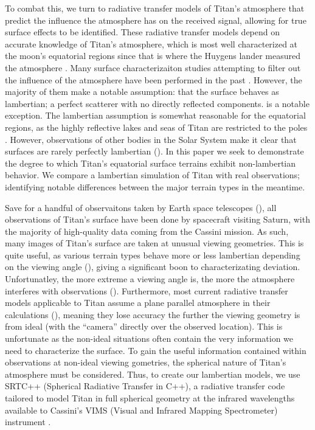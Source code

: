 \documentclass[twocolumn,linenumbers]{aastex631}
\begin{document}
To combat this, we turn to radiative transfer models of Titan's atmosphere that predict the influence the atmosphere has on the received signal, allowing for true surface effects to be identified. These radiative transfer models depend on accurate knowledge of Titan's atmosphere, which is most well characterized at the moon's equatorial regions since that is where the Huygens lander measured the atmosphere \citep{Tomasko2008}. Many surface characterizaiton studies attempting to filter out the influence of the atmosphere have been performed in the past \citep{Soderblom2009, Kazeminejad2011, Brossier2018, EsSayeh2023, Solomonidou2024}. However, the majority of them make a notable assumption: that the surface behaves as lambertian; a perfect scatterer with no directly reflected components. \cite{Buratti2006} is a notable exception. The lambertian assumption is somewhat reasonable for the equatorial regions, as the highly reflective lakes and seas of Titan are restricted to the poles \citep{Hayes2016}. However, observations of other bodies in the Solar System make it clear that surfaces are rarely perfectly lambertian (). In this paper we seek to demonstrate the degree to which Titan's equatorial surface terrains exhibit non-lambertian behavior. We compare a lambertian simulation of Titan with real observations; identifying notable differences between the major terrain types in the meantime.

Save for a handful of observaitons taken by Earth space telescopes (), all observations of Titan's surface have been done by spacecraft visiting Saturn, with the majority of high-quality data coming from the Cassini mission. As such, many images of Titan's surface are taken at unusual viewing geometries. This is quite useful, as various terrain types behave more or less lambertian depending on the viewing angle (), giving a significant boon to characterizating deviation. Unfortunatley, the more extreme a viewing angle is, the more the atmosphere interferes with observations (). Furthermore, most current radiative transfer models applicable to Titan assume a plane parallel atmosphere in their calculations (), meaning they lose accuracy the further the viewing geometry is from ideal (with the ``camera'' directly over the observed location). This is unfortunate as the non-ideal situations often contain the very information we need to characterize the surface. To gain the useful information contained within observations at non-ideal viewing gometries, the spherical nature of Titan's atmosphere must be considered. Thus, to create our lambertian models, we use SRTC++ (Spherical Radiative Transfer in C++), a radiative transfer code tailored to model Titan in full spherical geometry at the infrared wavelengths available to Cassini's VIMS (Visual and Infrared Mapping Spectrometer) instrument \citep{Barnes2018}.  
\end{document}

